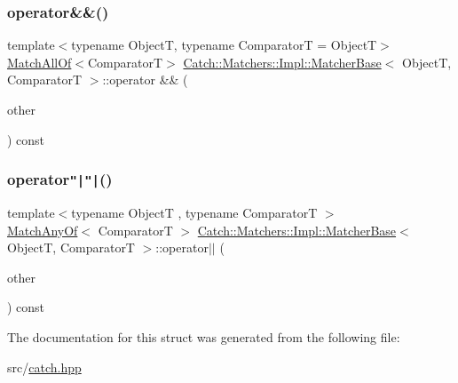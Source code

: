 \mbox{\label{struct_catch_1_1_matchers_1_1_impl_1_1_matcher_base_a3deede6b29d20c15cb5efc79df40a520}} 
\subsubsection{\texorpdfstring{operator\&\&()}{operator\&\&()}}
{\footnotesize\ttfamily template$<$typename ObjectT, typename ComparatorT = ObjectT$>$ \\
\hyperlink{struct_catch_1_1_matchers_1_1_impl_1_1_match_all_of}{Match\+All\+Of}$<$ComparatorT$>$ \hyperlink{struct_catch_1_1_matchers_1_1_impl_1_1_matcher_base}{Catch\+::\+Matchers\+::\+Impl\+::\+Matcher\+Base}$<$ ObjectT, ComparatorT $>$\+::operator \&\& (\begin{DoxyParamCaption}\item[{\hyperlink{struct_catch_1_1_matchers_1_1_impl_1_1_matcher_base}{Matcher\+Base}$<$ ObjectT, ComparatorT $>$ const \&}]{other }\end{DoxyParamCaption}) const}

\mbox{\label{struct_catch_1_1_matchers_1_1_impl_1_1_matcher_base_ae0345ee76d109ac6d0241be261450ebc}} 
\subsubsection{\texorpdfstring{operator\texttt{"|}\texttt{"|}()}{operator||()}}
{\footnotesize\ttfamily template$<$typename ObjectT , typename ComparatorT $>$ \\
\hyperlink{struct_catch_1_1_matchers_1_1_impl_1_1_match_any_of}{Match\+Any\+Of}$<$ ComparatorT $>$ \hyperlink{struct_catch_1_1_matchers_1_1_impl_1_1_matcher_base}{Catch\+::\+Matchers\+::\+Impl\+::\+Matcher\+Base}$<$ ObjectT, ComparatorT $>$\+::operator$\vert$$\vert$ (\begin{DoxyParamCaption}\item[{\hyperlink{struct_catch_1_1_matchers_1_1_impl_1_1_matcher_base}{Matcher\+Base}$<$ ObjectT, ComparatorT $>$ const \&}]{other }\end{DoxyParamCaption}) const}



The documentation for this struct was generated from the following file\+:\begin{DoxyCompactItemize}
\item 
src/\hyperlink{catch_8hpp}{catch.\+hpp}\end{DoxyCompactItemize}
